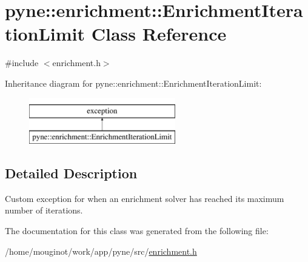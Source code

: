 \hypertarget{classpyne_1_1enrichment_1_1_enrichment_iteration_limit}{}\section{pyne\+:\+:enrichment\+:\+:Enrichment\+Iteration\+Limit Class Reference}
\label{classpyne_1_1enrichment_1_1_enrichment_iteration_limit}


{\ttfamily \#include $<$enrichment.\+h$>$}

Inheritance diagram for pyne\+:\+:enrichment\+:\+:Enrichment\+Iteration\+Limit\+:\begin{figure}[H]
\begin{center}
\leavevmode
\includegraphics[height=2.000000cm]{classpyne_1_1enrichment_1_1_enrichment_iteration_limit}
\end{center}
\end{figure}


\subsection{Detailed Description}
Custom exception for when an enrichment solver has reached its maximum number of iterations. 

The documentation for this class was generated from the following file\+:\begin{DoxyCompactItemize}
\item 
/home/mouginot/work/app/pyne/src/\hyperlink{enrichment_8h}{enrichment.\+h}\end{DoxyCompactItemize}
